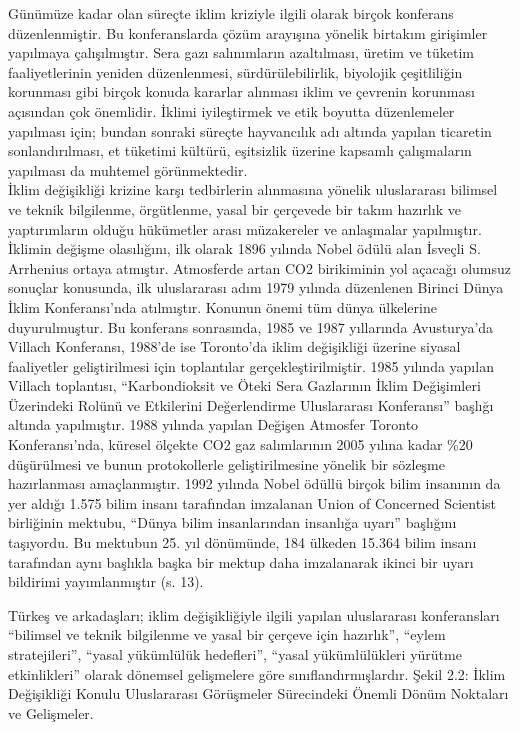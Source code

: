 \documentclass[
]{book}
\begin{document}
Günümüze kadar olan süreçte iklim kriziyle ilgili olarak birçok konferans düzenlenmiştir. Bu konferanslarda çözüm arayışına yönelik birtakım girişimler yapılmaya çalışılmıştır. Sera gazı salınımların azaltılması, üretim ve tüketim faaliyetlerinin yeniden düzenlenmesi, sürdürülebilirlik, biyolojik çeşitliliğin korunması gibi birçok konuda kararlar alınması iklim ve çevrenin korunması açısından çok önemlidir. İklimi iyileştirmek ve etik boyutta düzenlemeler yapılması için; bundan sonraki süreçte hayvancılık adı altında yapılan ticaretin sonlandırılması, et tüketimi kültürü, eşitsizlik üzerine kapsamlı çalışmaların yapılması da muhtemel görünmektedir.\\
İklim değişikliği krizine karşı tedbirlerin alınmasına yönelik uluslararası bilimsel ve teknik bilgilenme, örgütlenme, yasal bir çerçevede bir takım hazırlık ve yaptırımların olduğu hükümetler arası müzakereler ve anlaşmalar yapılmıştır. İklimin değişme olasılığını, ilk olarak 1896 yılında Nobel ödülü alan İsveçli S. Arrhenius ortaya atmıştır. Atmosferde artan CO2 birikiminin yol açacağı olumsuz sonuçlar konusunda, ilk uluslararası adım 1979 yılında düzenlenen Birinci Dünya İklim Konferansı'nda atılmıştır. Konunun önemi tüm dünya ülkelerine duyurulmuştur. Bu konferans sonrasında, 1985 ve 1987 yıllarında Avusturya'da Villach Konferansı, 1988'de ise Toronto'da iklim değişikliği üzerine siyasal faaliyetler geliştirilmesi için toplantılar gerçekleştirilmiştir. 1985 yılında yapılan Villach toplantısı, ``Karbondioksit ve Öteki Sera Gazlarının İklim Değişimleri Üzerindeki Rolünü ve Etkilerini Değerlendirme Uluslararası Konferansı'' başlığı altında yapılmıştır. 1988 yılında yapılan Değişen Atmosfer Toronto Konferansı'nda, küresel ölçekte CO2 gaz salımlarının 2005 yılına kadar \%20 düşürülmesi ve bunun protokollerle geliştirilmesine yönelik bir sözleşme hazırlanması amaçlanmıştır. \citep{turkes2001kuresel} 1992 yılında Nobel ödüllü birçok bilim insanının da yer aldığı 1.575 bilim insanı tarafından imzalanan Union of Concerned Scientist birliğinin mektubu, ``Dünya bilim insanlarından insanlığa uyarı'' başlığını taşıyordu. Bu mektubun 25. yıl dönümünde, 184 ülkeden 15.364 bilim insanı tarafından aynı başlıkla başka bir mektup daha imzalanarak ikinci bir uyarı bildirimi yayımlanmıştır (s. 13).\citep{harvey2016climate}

Türkeş ve arkadaşları; iklim değişikliğiyle ilgili yapılan uluslararası konferansları ``bilimsel ve teknik bilgilenme ve yasal bir çerçeve için hazırlık'', ``eylem stratejileri'', ``yasal yükümlülük hedefleri'', ``yasal yükümlülükleri yürütme etkinlikleri'' olarak dönemsel gelişmelere göre sınıflandırmışlardır.
Şekil 2.2: İklim Değişikliği Konulu Uluslararası Görüşmeler Sürecindeki Önemli Dönüm Noktaları ve Gelişmeler.
\end{document}
